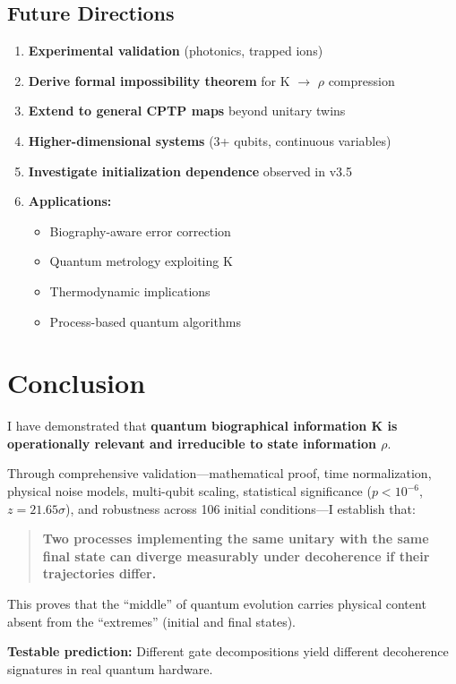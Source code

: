 \documentclass[11pt, onecolumn, letterpaper]{article}
\begin{document}
\subsection{Future Directions}
\begin{enumerate}
    \item \textbf{Experimental validation} (photonics, trapped ions)
    \item \textbf{Derive formal impossibility theorem} for K $\rightarrow$ $\rho$ compression
    \item \textbf{Extend to general CPTP maps} beyond unitary twins
    \item \textbf{Higher-dimensional systems} (3+ qubits, continuous variables)
    \item \textbf{Investigate initialization dependence} observed in v3.5
    \item \textbf{Applications:}
    \begin{itemize}
        \item Biography-aware error correction
        \item Quantum metrology exploiting K
        \item Thermodynamic implications
        \item Process-based quantum algorithms
    \end{itemize}
\end{enumerate}

\section{Conclusion}
I have demonstrated that \textbf{quantum biographical information K is operationally relevant and irreducible to state information $\rho$}.

Through comprehensive validation---mathematical proof, time normalization, physical noise models, multi-qubit scaling, statistical significance ($p < 10^{-6}$, $z = 21.65\sigma$), and robustness across 106 initial conditions---I establish that:

\begin{quote}
\textbf{Two processes implementing the same unitary with the same final state can diverge measurably under decoherence if their trajectories differ.}
\end{quote}

This proves that the ``middle'' of quantum evolution carries physical content absent from the ``extremes'' (initial and final states).

\textbf{Testable prediction:} Different gate decompositions yield different decoherence signatures in real quantum hardware.
\end{document}
